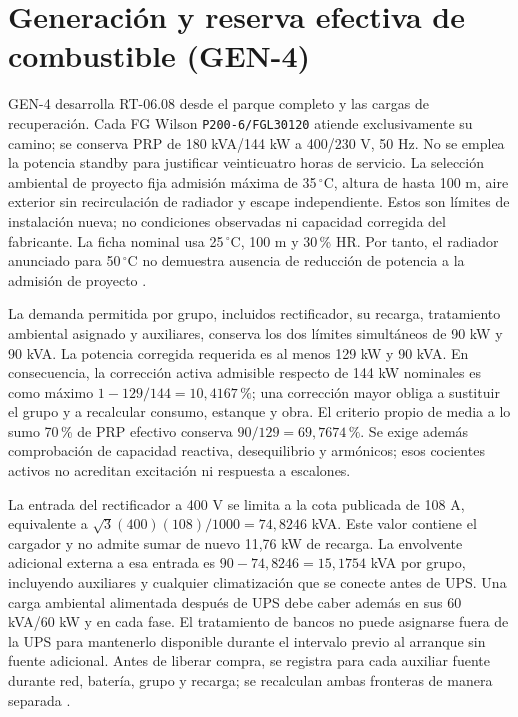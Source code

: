 \section{Generación y reserva efectiva de combustible (GEN-4)}
\label{sec:sd4-generacion-gen4}

GEN-4 desarrolla RT-06.08 desde el parque completo y las cargas de recuperación. Cada FG Wilson \texttt{P200-6/FGL30120} atiende exclusivamente su camino; se conserva PRP de 180 kVA/144 kW a 400/230 V, 50 Hz. No se emplea la potencia standby para justificar veinticuatro horas de servicio. La selección ambiental de proyecto fija admisión máxima de 35\,$^{\circ}$C, altura de hasta 100 m, aire exterior sin recirculación de radiador y escape independiente. Estos son límites de instalación nueva; no condiciones observadas ni capacidad corregida del fabricante. La ficha nominal usa 25\,$^{\circ}$C, 100 m y 30\,\% HR. Por tanto, el radiador anunciado para 50\,$^{\circ}$C no demuestra ausencia de reducción de potencia a la admisión de proyecto \parencite[pp.~1--5]{p7-fg-p200-ficha}.

La demanda permitida por grupo, incluidos rectificador, su recarga, tratamiento ambiental asignado y auxiliares, conserva los dos límites simultáneos de 90 kW y 90 kVA. La potencia corregida requerida es al menos 129 kW y 90 kVA. En consecuencia, la corrección activa admisible respecto de 144 kW nominales es como máximo $1-129/144=10,4167\,\%$; una corrección mayor obliga a sustituir el grupo y a recalcular consumo, estanque y obra. El criterio propio de media a lo sumo 70\,\% de PRP efectivo conserva $90/129=69,7674\,\%$. Se exige además comprobación de capacidad reactiva, desequilibrio y armónicos; esos cocientes activos no acreditan excitación ni respuesta a escalones.

La entrada del rectificador a 400 V se limita a la cota publicada de 108 A, equivalente a $\sqrt{3}(400)(108)/1000=74,8246$ kVA. Este valor contiene el cargador y no admite sumar de nuevo 11,76 kW de recarga. La envolvente adicional externa a esa entrada es $90-74,8246=15,1754$ kVA por grupo, incluyendo auxiliares y cualquier climatización que se conecte antes de UPS. Una carga ambiental alimentada después de UPS debe caber además en sus 60 kVA/60 kW y en cada fase. El tratamiento de bancos no puede asignarse fuera de la UPS para mantenerlo disponible durante el intervalo previo al arranque sin fuente adicional. Antes de liberar compra, se registra para cada auxiliar fuente durante red, batería, grupo y recarga; se recalculan ambas fronteras de manera separada \parencites[pp.~33--35]{p7-eaton-93t-guia}{p7-eaton-93t-tecnica}.

